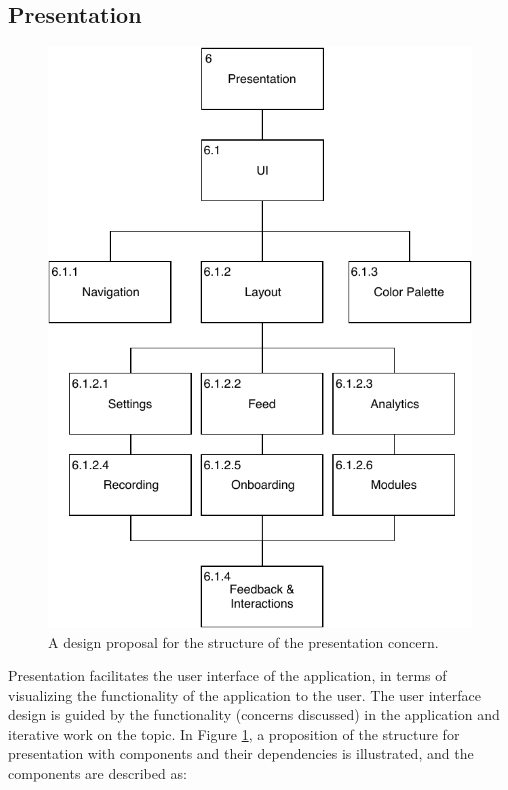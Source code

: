 \subsection{Presentation}\label{soc:presentation}
\begin{figure}
    \centering
    \includegraphics[scale=0.7]{images/Presentation_Design.pdf}
    \caption{A design proposal for the structure of the presentation concern.}
    \label{fig:hta_presentation}
\end{figure}

Presentation facilitates the user interface of the application, in terms of visualizing the functionality of the application to the user. The user interface design is guided by the functionality (concerns discussed) in the application and iterative work on the topic. In Figure \ref{fig:hta_presentation}, a proposition of the structure for presentation with components and their dependencies is illustrated, and the components are described as:

